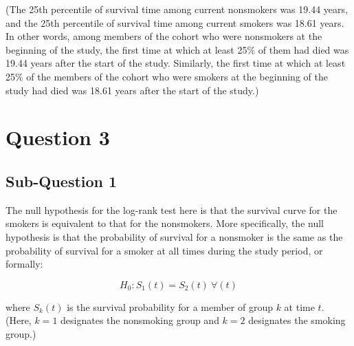 \documentclass{article}\usepackage[]{graphicx}\usepackage[]{color}
\newif\ifdraft  %
\begin{document}
\vspace{2mm}

(The 25th percentile of survival time among current nonsmokers was 19.44 years, and the 25th percentile of survival time among current smokers was 18.61 years.  In other words, among members of the cohort who were nonsmokers at the beginning of the study, the first time at which at least 25\% of them had died was 19.44 years after the start of the study.  Similarly, the first time at which at least 25\% of the members of the cohort who were smokers at the beginning of the study had died was 18.61 years after the start of the study.)








\pagebreak

\section*{Question 3}

\ifdraft

Answer the following questions about the log-rank test: \textbf{(10 points total)}
  \begin{enumerate}
    \item Describe the specific null and alternative hypotheses that the log-rank test is considering here.
    \item What do you conclude from this test (use 5\% significance criteria)? List a limitation of the inference that you obtain from the log-rank test.
  \end{enumerate}

\fi

\subsection*{Sub-Question 1}

The null hypothesis for the log-rank test here is that the survival curve for the smokers is equivalent to that for the nonsmokers.  More specifically, the null hypothesis is that the probability of survival for a nonsmoker is the same as the probability of survival for a smoker at all times during the study period, or formally:

$$ H_0: S_1(t) = S_2(t) \: \forall(t) $$

where $S_k(t)$ is the survival probability for a member of group $k$ at time $t$.  (Here, $k=1$ designates the nonsmoking group and $k=2$ designates the smoking group.)
\end{document}
